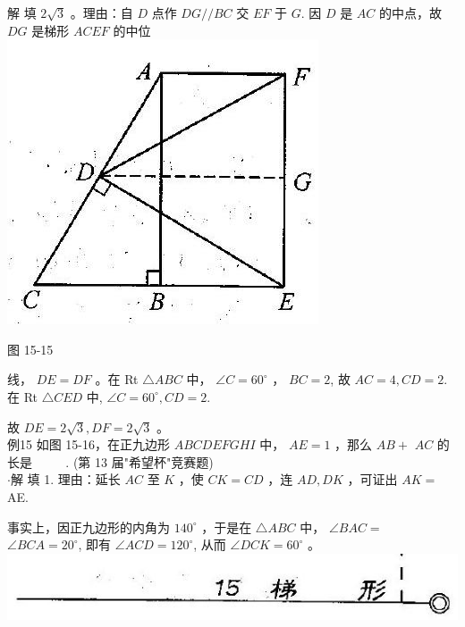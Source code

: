 \documentclass[10pt]{article}
\begin{document}
解 填 $2 \sqrt{3}$ 。理由：自 $D$ 点作 $D G / / B C$ 交 $E F$ 于 $G$. 因 $D$ 是 $A C$ 的中点，故 $D G$ 是梯形 $A C E F$ 的中位\\
\includegraphics[max width=\textwidth, center]{2024_10_30_2c8f45efd4a519b08e1ag-143(2)}

图 15-15

线， $D E=D F$ 。在 Rt $\triangle A B C$ 中， $\angle C=60^{\circ}$ ， $B C=2$, 故 $A C=4, C D=2$. 在 Rt $\triangle C E D$ 中, $\angle C=60^{\circ}, C D=2$.

故 $D E=2 \sqrt{3}, D F=2 \sqrt{3}$ 。\\
例15 如图 15-16，在正九边形 $A B C D E F G H I$ 中， $A E=1$ ，那么 $A B+$ $A C$ 的长是 $\qquad$ . (第 13 届"希望杯"竞赛题)\\
$\cdot$解 填 1. 理由：延长 $A C$ 至 $K$ ，使 $C K=C D$ ，连 $A D, D K$ ，可证出 $A K=$ AE.

事实上，因正九边形的内角为 $140^{\circ}$ ，于是在 $\triangle A B C$ 中， $\angle B A C=$ $\angle B C A=20^{\circ}$, 即有 $\angle A C D=120^{\circ}$, 从而 $\angle D C K=60^{\circ}$ 。\\
\includegraphics[max width=\textwidth, center]{2024_10_30_2c8f45efd4a519b08e1ag-143(1)}
\end{document}
